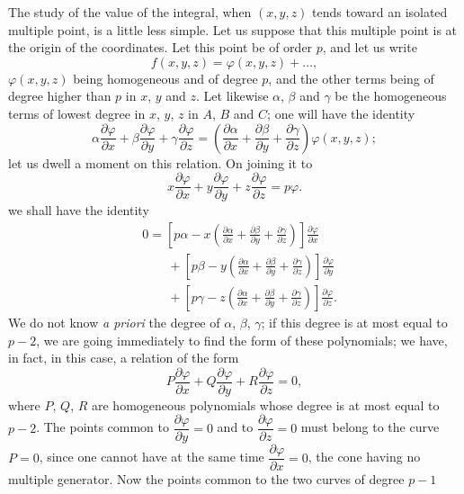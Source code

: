 \documentclass{article}
\begin{document}
The study of the value of the integral, when $(x, y, z)$ tends toward an isolated multiple point, is a little less simple. Let us suppose that this multiple point is at the origin of the coordinates. Let this point be of order $p$, and let us write
\[
f(x, y, z) = \varphi(x, y, z) + \ldots,
\]
$\varphi(x, y, z)$ being homogeneous and of degree $p$, and the other terms being of degree higher than $p$ in $x$, $y$ and $z$. Let likewise $\alpha$, $\beta$ and $\gamma$ be the homogeneous terms of lowest degree in $x$, $y$, $z$ in $A$, $B$ and $C$; one will have the identity
\[
\alpha \frac{\partial \varphi}{\partial x} + \beta \frac{\partial \varphi}{\partial y} + \gamma \frac{\partial \varphi}{\partial z} = \left( \frac{\partial \alpha}{\partial x} + \frac{\partial \beta}{\partial y} + \frac{\partial \gamma}{\partial z} \right) \varphi(x, y, z);
\]
let us dwell a moment on this relation. On joining it to
\[
x \frac{\partial \varphi}{\partial x} + y \frac{\partial \varphi}{\partial y} + z \frac{\partial \varphi}{\partial z} = p\varphi.
\]
we shall have the identity
\[
\begin{aligned}
&0 = \left[ p\alpha - x \left( \frac{\partial \alpha}{\partial x} + \frac{\partial \beta}{\partial y} + \frac{\partial \gamma}{\partial z} \right) \right] \frac{\partial \varphi}{\partial x} \\
&\qquad + \left[ p\beta - y \left( \frac{\partial \alpha}{\partial x} + \frac{\partial \beta}{\partial y} + \frac{\partial \gamma}{\partial z} \right) \right] \frac{\partial \varphi}{\partial y} \\
&\qquad + \left[ p\gamma - z \left( \frac{\partial \alpha}{\partial x} + \frac{\partial \beta}{\partial y} + \frac{\partial \gamma}{\partial z} \right) \right] \frac{\partial \varphi}{\partial z}.
\end{aligned}
\]
We do not know \emph{a priori} the degree of $\alpha$, $\beta$, $\gamma$; if this degree is at most equal to $p - 2$, we are going immediately to find the form of these polynomials; we have, in fact, in this case, a relation of the form
\[
P \frac{\partial \varphi}{\partial x} + Q \frac{\partial \varphi}{\partial y} + R \frac{\partial \varphi}{\partial z} = 0, \tag{1}
\]
where $P$, $Q$, $R$ are homogeneous polynomials whose degree is at most equal to $p - 2$. The points common to $\dfrac{\partial \varphi}{\partial y} = 0$ and to $\dfrac{\partial \varphi}{\partial z} = 0$ must belong to the curve $P = 0$, since one cannot have at the same time $\dfrac{\partial \varphi}{\partial x} = 0$, the cone having no multiple generator. Now the points common to the two curves of degree $p - 1$
\end{document}
